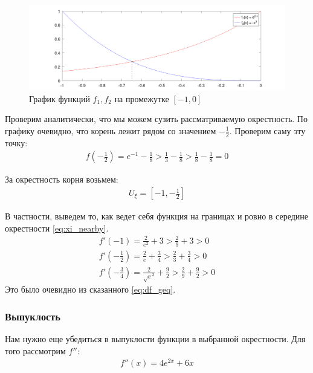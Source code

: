 \begin{figure}[h!]
  \centering
  \includegraphics[width=\textwidth]{graphics/plot.png} 
  \caption{График функций \(f_1, f_2\) на промежутке \([-1, 0]\)}
\end{figure}

Проверим аналитически, что мы можем сузить рассматриваемую окрестность. По графику очевидно, что корень лежит рядом со значением \(-\frac{1}{2}\). Проверим саму эту точку:
\begin{align}\label{eq:right_border}
  f(-\frac{1}{2}) = e^{-1} - \frac{1}{8} > \frac{1}{3} - \frac{1}{8} > \frac{1}{8} - \frac{1}{8} = 0
\end{align}

За окрестность корня возьмем:
\begin{align}\label{eq:xi_nearby}
  U_\xi = \left[-1, -\frac{1}{2}\right]
\end{align}

В частности, выведем то, как ведет себя функция на границах и ровно в середине окрестности \eqref{eq:xi_nearby}. 
\begin{align} 
  \label{eq:dx_left_bound}
  f'(-1)  = \frac{2}{e^2} + 3 > \frac{2}{9} + 3 > 0 \\ 
  \label{eq:dx_middle_bound}
  f'\left(-\frac{1}{2}\right) = \frac{2}{e} + \frac{3}{4} > \frac{2}{3} + \frac{3}{4} > 0 \\ 
  \label{eq:dx_right_bound}
  f'\left(-\frac{3}{4}\right) = \frac{2}{\sqrt{e}^3} + \frac{9}{2} > \frac{2}{9} + \frac{9}{2} > 0 
\end{align}
Это было очевидно из сказанного \eqref{eq:df_geq}.

\subsubsection{Выпуклость}
Нам нужно еще убедиться в выпуклости функции в выбранной окрестности. Для того рассмотрим \(f''\):
\begin{align}
  f''(x) = 4e^{2x} + 6x
\end{align}


